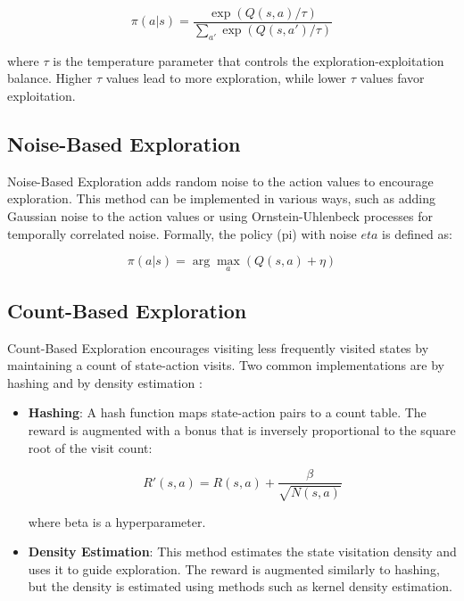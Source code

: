 \documentclass[../Main.tex]{subfiles}
\begin{document}
\begin{equation}
    \pi(a|s) = \frac{\exp(Q(s, a) / \tau)}{\sum_{a'} \exp(Q(s, a') / \tau)}
\end{equation}

where \(\tau\) is the temperature parameter that controls the exploration-exploitation balance. Higher \(\tau\) values lead to more exploration, while lower \(\tau\) values favor exploitation.

\subsection{Noise-Based Exploration}

Noise-Based Exploration adds random noise to the action values to encourage exploration. This method can be implemented in various ways, such as adding Gaussian noise to the action values or using Ornstein-Uhlenbeck processes for temporally correlated noise. Formally, the policy (pi) with noise \(eta\) is defined as:

\begin{equation}
    \pi(a|s) = \arg\max_{a} \left( Q(s, a) + \eta \right)
\end{equation}

\subsection{Count-Based Exploration}

Count-Based Exploration encourages visiting less frequently visited states by maintaining a count of state-action visits. Two common implementations are by hashing and by density estimation \cite{strehl2008analysis}:

\begin{itemize}
    \item \textbf{Hashing}: A hash function maps state-action pairs to a count table. The reward is augmented with a bonus that is inversely proportional to the square root of the visit count:

\begin{equation}
        R'(s, a) = R(s, a) + \frac{\beta}{\sqrt{N(s, a)}}
    \end{equation}

where beta is a hyperparameter.

    \item \textbf{Density Estimation}: This method estimates the state visitation density and uses it to guide exploration. The reward is augmented similarly to hashing, but the density is estimated using methods such as kernel density estimation.
\end{itemize}


\biblio %
\end{document}
